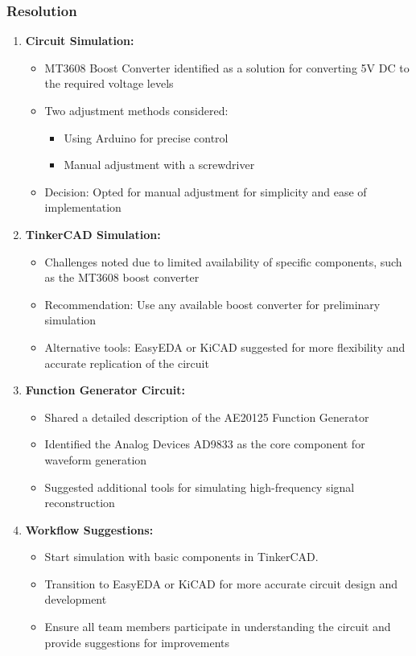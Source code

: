 \documentclass[12pt,a4paper]{article}
\begin{document}
\subsubsection*{Resolution}
\begin{enumerate}
    \item \textbf{Circuit Simulation:}
    \begin{itemize}
        \item MT3608 Boost Converter identified as a solution for converting 5V DC to the required voltage levels
        \item Two adjustment methods considered:
        \begin{itemize}
            \item Using Arduino for precise control
            \item Manual adjustment with a screwdriver
        \end{itemize}
        \item Decision: Opted for manual adjustment for simplicity and ease of implementation
    \end{itemize}
    \item \textbf{TinkerCAD Simulation:}
    \begin{itemize}
        \item Challenges noted due to limited availability of specific components, such as the MT3608 boost converter
        \item Recommendation: Use any available boost converter for preliminary simulation
        \item Alternative tools: EasyEDA or KiCAD suggested for more flexibility and accurate replication of the circuit
    \end{itemize}
    \item \textbf{Function Generator Circuit:}
    \begin{itemize}
        \item Shared a detailed description of the AE20125 Function Generator
        \item Identified the Analog Devices AD9833 as the core component for waveform generation
        \item Suggested additional tools for simulating high-frequency signal reconstruction
    \end{itemize}
    \item \textbf{Workflow Suggestions:}
    \begin{itemize}
        \item Start simulation with basic components in TinkerCAD.
        \item Transition to EasyEDA or KiCAD for more accurate circuit design and development
        \item Ensure all team members participate in understanding the circuit and provide suggestions for improvements
    \end{itemize}
\end{enumerate}
\end{document}
